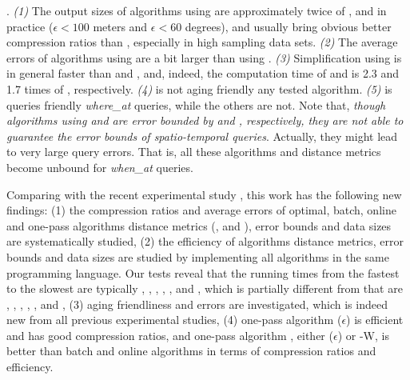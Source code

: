 {.
\emph{(1)} The output sizes of algorithms using \sed are approximately twice of \ped, and in practice (\eg $\epsilon <100$ meters and $\epsilon < 60$ degrees), \ped and \sed usually bring obvious better compression ratios than \dad, especially in high sampling data sets.
%
\emph{(2)} The average errors of algorithms using \sed are a bit larger than using \ped.
%
\emph{(3)} Simplification using \dad is in general faster than \ped and \sed, and, indeed, the computation time of \ped and \sed is 2.3 and 1.7 times of \dad, respectively.
%
{\emph{(4)} \dad is not aging friendly \wrt any tested algorithm.}
%
{\emph{(5)} \sed is queries friendly {\wrt \emph{where\_at} queries,}  while the others are not. }
{Note that, \emph{though algorithms using \ped and \dad are error bounded by \ped and \dad, respectively, they are not able to guarantee the error bounds of spatio-temporal queries}. Actually, they might lead to very large query errors.}
{That is, all these algorithms and distance metrics become unbound for \emph{when\_at} queries.}



{Comparing with the recent experimental study \cite{Zhang:Evaluation}, this work has the following new findings:
	(1) the compression ratios and average errors of optimal, batch, online and one-pass algorithms \wrt distance metrics (\ped, \sed and \dad), error bounds and data sizes are systematically studied,
	(2) the efficiency of algorithms \wrt distance metrics, error bounds and data sizes are studied by implementing all algorithms in the same programming language. Our tests reveal that the running times from the fastest to the slowest are typically \intersec, \interval, \operb, \squishe, \dpa, \dagots and \bqsa, which is partially different from \cite{Zhang:Evaluation} that are \intersec, \interval, \dpa, \operb, \dagots, \squishe and \bqsa,
	(3) aging friendliness and errors are investigated, which is indeed new from all previous experimental studies,
	(4) one-pass algorithm \siped ($\epsilon$) is efficient and has good compression ratios, and one-pass algorithm \cised, either \cised($\epsilon$) or \cised-W, is better than batch and online algorithms in terms of compression ratios and efficiency.}



}
